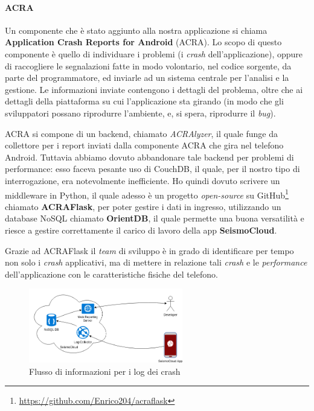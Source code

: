 \documentclass[a4paper,10pt]{memoir}
\begin{document}
\paragraph{ACRA} Un componente che è stato aggiunto alla nostra applicazione si chiama \textbf{Application Crash Reports for Android} (ACRA). Lo scopo di questo componente è quello di individuare i problemi (i \textit{crash} dell'applicazione), oppure di raccogliere le segnalazioni fatte in modo volontario, nel codice sorgente, da parte del programmatore, ed inviarle ad un sistema centrale per l'analisi e la gestione. Le informazioni inviate contengono i dettagli del problema, oltre che ai dettagli della piattaforma su cui l'applicazione sta girando (in modo che gli sviluppatori possano riprodurre l'ambiente, e, si spera, riprodurre il \textit{bug}).

ACRA si compone di un backend, chiamato \textit{ACRAlyzer}, il quale funge da collettore per i report inviati dalla componente ACRA che gira nel telefono Android. Tuttavia abbiamo dovuto abbandonare tale backend per problemi di performance: esso faceva pesante uso di CouchDB, il quale, per il nostro tipo di interrogazione, era notevolmente inefficiente. Ho quindi dovuto scrivere un middleware in Python, il quale adesso è un progetto \textit{open-source} su GitHub\footnote{\url{https://github.com/Enrico204/acraflask}} chiamato \textbf{ACRAFlask}, per poter gestire i dati in ingresso, utilizzando un database NoSQL chiamato \textbf{OrientDB}, il quale permette una buona versatilità e riesce a gestire correttamente il carico di lavoro della app \textbf{SeismoCloud}.

Grazie ad ACRAFlask il \textit{team} di sviluppo è in grado di identificare per tempo non solo i \textit{crash} applicativi, ma di mettere in relazione tali \textit{crash} e le \textit{performance} dell'applicazione con le caratteristiche fisiche del telefono.

\begin{figure}[ht]
\centering
\caption{Flusso di informazioni per i log dei crash}
\includegraphics[width=0.6\textwidth]{dev/acracollector}
\end{figure}
\end{document}
